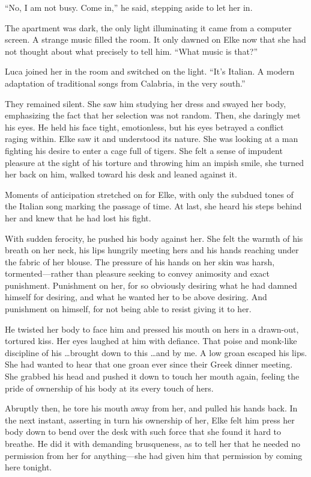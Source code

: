 ``No, I am not busy. Come in,'' he said, stepping aside to let her in.

The apartment was dark, the only light illuminating it came from a computer screen. A strange music filled the room. It only dawned on Elke now that she had not thought about what precisely to tell him. ``What music is that?''

Luca joined her in the room and switched on the light. ``It's Italian. A modern adaptation of traditional songs from Calabria, in the very south.''

They remained silent. She saw him studying her dress and swayed her body, emphasizing the fact that her selection was not random. Then, she daringly met his eyes. He held his face tight, emotionless, but his eyes betrayed a conflict raging within. Elke saw it and understood its nature. She was looking at a man fighting his desire to enter a cage full of tigers. She felt a sense of impudent pleasure at the sight of his torture and throwing him an impish smile, she turned her back on him, walked toward his desk and leaned against it.

Moments of anticipation stretched on for Elke, with only the subdued tones of the Italian song marking the passage of time. At last, she heard his steps behind her and knew that he had lost his fight.

With sudden ferocity, he pushed his body against her. She felt the warmth of his breath on her neck, his lips hungrily meeting hers and his hands reaching under the fabric of her blouse. The pressure of his hands on her skin was harsh, tormented---rather than pleasure seeking to convey animosity and exact punishment. Punishment on her, for so obviously desiring what he had damned himself for desiring, and what he wanted her to be above desiring. And punishment on himself, for not being able to resist giving it to her.

He twisted her body to face him and pressed his mouth on hers in a drawn-out, tortured kiss. Her eyes laughed at him with defiance. That poise and monk-like discipline of his \ldots brought down to this \ldots and by me. A low groan escaped his lips. She had wanted to hear that one groan ever since their Greek dinner meeting. She grabbed his head and pushed it down to touch her mouth again, feeling the pride of ownership of his body at its every touch of hers.

Abruptly then, he tore his mouth away from her, and pulled his hands back. In the next instant, asserting in turn his ownership of her, Elke felt him press her body down to bend over the desk with such force that she found it hard to breathe. He did it with demanding brusqueness, as to tell her that he needed no permission from her for anything---she had given him that permission by coming here tonight.

